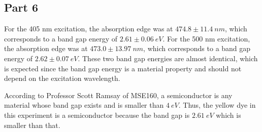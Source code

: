 \subsection{Part 6}


For the 405 nm excitation, the absorption edge was at $474.8 \pm 11.4 ~nm$, which corresponds to a band gap energy of $2.61 \pm 0.06 ~eV$. For the 500 nm excitation, the absorption edge was at $473.0 \pm 13.97~nm$, which corresponds to a band gap energy of $2.62 \pm 0.07 ~eV$. These two band gap energies are almost identical, which is expected since the band gap energy is a material property and should not depend on the excitation wavelength.

According to Professor Scott Ramsay of MSE160, a semiconductor is any material whose band gap exists and is smaller than $4~eV$. Thus, the yellow dye in this experiment is a semiconductor because the band gap is $2.61 ~eV$ which is smaller than that.